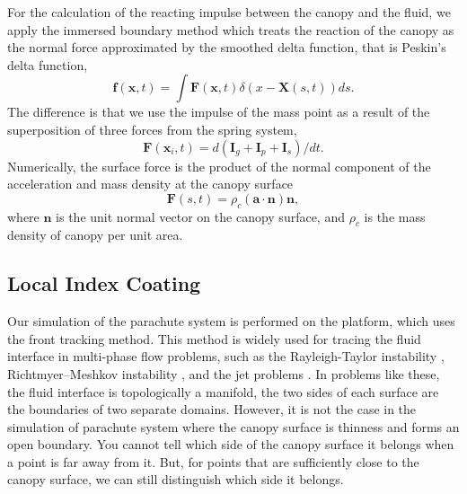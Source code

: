 For the calculation of the reacting impulse between the canopy and the 
fluid, we apply the immersed boundary method which treats the reaction of 
the canopy as the normal force approximated by the smoothed delta function, 
that is Peskin's delta function, 
\begin{equation}
\mathbf{f}(\mathbf{x}, t) = \int \mathbf{F}(\mathbf{x}, t) \delta(x - \mathbf{X}(s, t)) ds.
\label{eqn:peskin_delta}
\end{equation}
The difference is that we use the impulse of the mass point as a result 
of the superposition of three forces from the spring system, 
\begin{equation}
\mathbf{F}(\mathbf{x}_{i}, t) = d(\mathbf{I}_{g} + \mathbf{I}_{p} + \mathbf{I}_{s}) / dt.
\end{equation}
Numerically, the surface force is the product of the normal component of 
the acceleration and mass density at the canopy surface 
\begin{equation}
\mathbf{F}(s, t) = \rho_{c} (\mathbf{a} \cdot \mathbf{n}) \mathbf{n}, 
\end{equation}
where $\mathbf{n}$ is the unit normal vector on the canopy surface, and 
$\rho_{c}$ is the mass density of canopy per unit area.

\subsection{Local Index Coating}
Our simulation of the parachute system is performed on the \FronTierp 
platform, which uses the front tracking method. 
This method is widely used for tracing the fluid interface in multi-phase 
flow problems, such as the Rayleigh-Taylor instability 
\cite{GliMcBMen86, GliLiMen90}, Richtmyer–Meshkov instability 
\cite{GarGliGro88}, and the jet problems \cite{GliKim04, GliLiOh02}. 
In problems like these, the fluid interface is topologically a manifold, 
the two sides of each surface are the boundaries of two separate domains. 
However, it is not the case in the simulation of parachute system where 
the canopy surface is thinness and forms an open boundary. 
You cannot tell which side of the canopy surface it belongs when a point is 
far away from it. 
But, for points that are sufficiently close to the canopy surface, we can 
still distinguish which side it belongs. 

